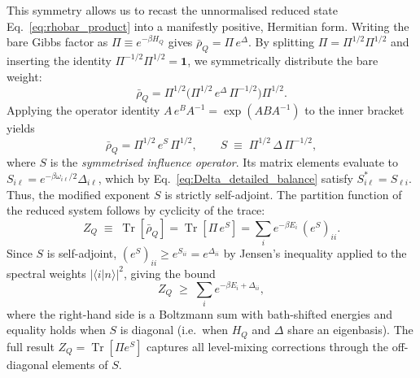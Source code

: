 This symmetry allows us to recast the unnormalised reduced state Eq.~\eqref{eq:rhobar_product} into a manifestly positive, Hermitian form. Writing the bare Gibbs factor as $\Pi \equiv e^{-\beta H_Q}$ gives $\bar\rho_Q = \Pi\,e^{\Delta}$. By splitting $\Pi = \Pi^{1/2}\Pi^{1/2}$ and inserting the identity $\Pi^{-1/2}\Pi^{1/2}=\mathbf{1}$, we symmetrically distribute the bare weight:
\begin{equation}
    \bar\rho_Q
    = \Pi^{1/2} \big( \Pi^{1/2}\,e^{\Delta}\,\Pi^{-1/2} \big) \Pi^{1/2}.
    \label{eq:rhobar_split}
\end{equation}
Applying the operator identity $A\,e^{B}A^{-1} = \exp(A B A^{-1})$ to the inner bracket yields
\begin{equation}
    \bar\rho_Q
    = \Pi^{1/2}\,e^{S}\,\Pi^{1/2},
    \qquad
    S \;\equiv\; \Pi^{1/2}\,\Delta\,\Pi^{-1/2},
    \label{eq:rhobar_symmetric}
\end{equation}
where $S$ is the \emph{symmetrised influence operator}. Its matrix elements evaluate to
$S_{i\ell}=e^{-\beta\omega_{i\ell}/2}\Delta_{i\ell}$, which by Eq.~\eqref{eq:Delta_detailed_balance} satisfy
$S_{i\ell}^{\ast}=S_{\ell i}$. Thus, the modified exponent $S$ is strictly self-adjoint.
The partition function of the reduced system follows by cyclicity of the trace:
\begin{equation}
    Z_Q
    \;\equiv\;
    \operatorname{Tr}[\bar\rho_Q]
    = \operatorname{Tr}[\Pi\,e^{S}]
    = \sum_i e^{-\beta E_i}\,(e^{S})_{ii}.
    \label{eq:ZQ_sym}
\end{equation}
Since $S$ is self-adjoint, $(e^{S})_{ii}\geq e^{S_{ii}}=e^{\Delta_{ii}}$ by Jensen's inequality
applied to the spectral weights $|\langle i|n\rangle|^2$, giving the bound
\begin{equation}
    Z_Q \;\geq\; \sum_i e^{-\beta E_i+\Delta_{ii}},
    \label{eq:ZQ_bound}
\end{equation}
where the right-hand side is a Boltzmann sum with bath-shifted energies and equality holds
when $S$ is diagonal (i.e.\ when $H_Q$ and $\Delta$ share an eigenbasis). The full result
$Z_Q=\operatorname{Tr}[\Pi e^{S}]$ captures all level-mixing corrections through the
off-diagonal elements of $S$.
